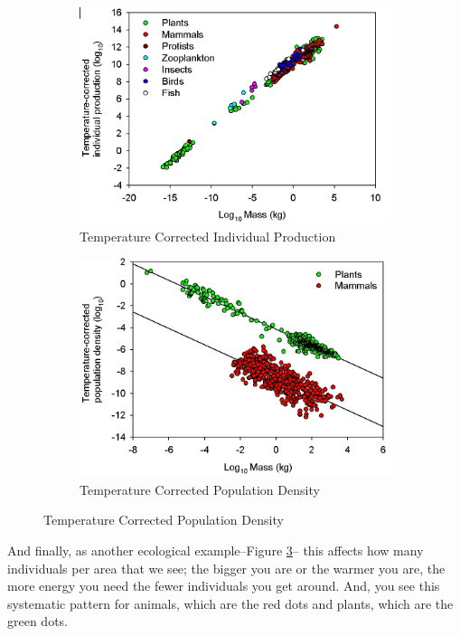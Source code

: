 \documentclass[]{article}
\begin{document}
\begin{figure}[H]
	\caption{Ecology and Temperature Correction}
	\begin{subfigure}[b]{0.5\textwidth}
		\caption{Temperature Corrected Individual Production\cite{ernest2003thermodynamic}}\label{fig:AndEcology}
		\includegraphics[width=\textwidth]{AndEcology1}
	\end{subfigure}
	\begin{subfigure}[b]{0.5\textwidth}
		\caption{Temperature Corrected Population Density\cite{ernest2003thermodynamic}}\label{fig:AndEcology2}
		\includegraphics[width=\textwidth]{AndEcology2}
	\end{subfigure}
\end{figure}

And finally, as another ecological example--Figure \ref{fig:AndEcology2}--
this affects how many individuals per area
that we see; the bigger you are
or the warmer you are,
the more energy you need
the fewer individuals you get around.
And, you see this systematic pattern
for animals,
which are the red dots
and plants,
which are the green dots.
\end{document}
